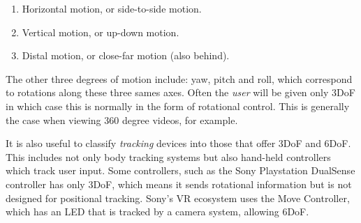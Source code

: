 \begin{enumerate}
    \item Horizontal motion, or side-to-side motion.
    \item Vertical motion, or up-down motion.
    \item Distal motion, or close-far motion (also behind).
\end{enumerate}

The other three degrees of motion include: yaw, pitch and roll, which correspond to rotations along these three sames axes. Often the \textit{user} will be given only 3DoF in which case this is normally in the form of rotational control. This is generally the case when viewing 360 degree videos, for example. 

It is also useful to classify \textit{tracking} devices into those that offer 3DoF and 6DoF. This includes not only body tracking systems but also hand-held controllers which track user input. Some controllers, such as the Sony Playstation DualSense controller has only 3DoF, which means it sends rotational information but is not designed for positional tracking. Sony's VR ecosystem uses the Move Controller, which has an LED that is tracked by a camera system, allowing 6DoF.

